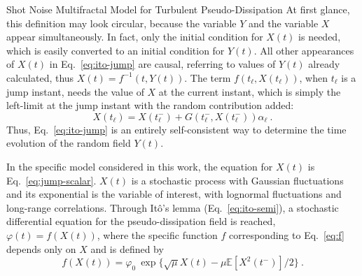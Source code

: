 \begin{chapter}{Shot Noise Multifractal Model for Turbulent Pseudo-Dissipation}
At first glance, this definition may look circular, because the variable $Y$ and the variable $X$ appear simultaneously. In fact, only the initial condition for $X(t)$ is needed, which is easily converted to an initial condition for $Y(t)$. All other appearances of $X(t)$ in Eq.~\eqref{eq:ito-jump} are causal, referring to values of $Y(t)$ already calculated, thus $X(t) = f^{-1}(t,Y(t))$. The term $f(t_{\ell},X(t_{\ell}))$, when $t_{\ell}$ is a jump instant, needs the value of $X$ at the current instant, which is simply the left-limit at the jump instant with the random contribution added:
\begin{equation} \label{eq:x-jump-gen}
    X(t_{\ell}) = X(t_{\ell}^-) + G(t_{\ell}^-,X(t_{\ell}^-)) \alpha_{\ell} \ .
\end{equation}
Thus, Eq.~\eqref{eq:ito-jump} is an entirely self-consistent way to determine the time evolution of the random field $Y(t)$.

In the specific model considered in this work, the equation for $X(t)$ is Eq.~\eqref{eq:jump-scalar}. $X(t)$ is a stochastic process with Gaussian fluctuations and its exponential is the variable of interest, with lognormal fluctuations and long-range correlations.
Through It\^{o}'s lemma (Eq.~\ref{eq:ito-semi}), a stochastic differential equation for the pseudo-dissipation field is reached, $\varphi(t) = f(X(t))$, where the specific function $f$ corresponding to Eq.~\eqref{eq:f} depends only on $X$ and is defined by
\begin{equation} \label{eq:exp}
    f(X(t)) = \varphi_0 \ \exp\{\sqrt{\mu} X(t)
    - \mu \mathbb{E}[X^2(t^-)]/2 \} \ \mbox{.}
\end{equation}


\end{chapter}
